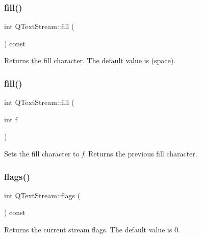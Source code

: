 \subsubsection{\texorpdfstring{fill()}{fill()}\hspace{0.1cm}{\footnotesize\ttfamily [1/2]}}
{\footnotesize\ttfamily int Q\+Text\+Stream\+::fill (\begin{DoxyParamCaption}{ }\end{DoxyParamCaption}) const\hspace{0.3cm}{\ttfamily [inline]}}

Returns the fill character. The default value is \textquotesingle{} \textquotesingle{} (space). \mbox{\label{class_q_text_stream_a36c4e45d5090252b3a0e335fd98f66d1}} 
\subsubsection{\texorpdfstring{fill()}{fill()}\hspace{0.1cm}{\footnotesize\ttfamily [2/2]}}
{\footnotesize\ttfamily int Q\+Text\+Stream\+::fill (\begin{DoxyParamCaption}\item[{int}]{f }\end{DoxyParamCaption})\hspace{0.3cm}{\ttfamily [inline]}}

Sets the fill character to {\itshape f}. Returns the previous fill character. \mbox{\label{class_q_text_stream_ab6cf395446ba04973dff067ab8b36978}} 
\subsubsection{\texorpdfstring{flags()}{flags()}\hspace{0.1cm}{\footnotesize\ttfamily [1/2]}}
{\footnotesize\ttfamily int Q\+Text\+Stream\+::flags (\begin{DoxyParamCaption}{ }\end{DoxyParamCaption}) const\hspace{0.3cm}{\ttfamily [inline]}}

Returns the current stream flags. The default value is 0.

